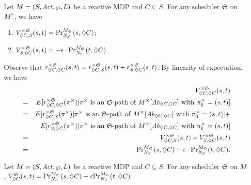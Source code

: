 \begin{proposition}
  Let $M = (S, \Act, \wp, L)$ be a reactive MDP and $C \subseteq S$.
  For any scheduler $\scheduler{S}$ on $M^{\times}$, we have
  \begin{enumerate}
  \item ${V}_{\gF C, S}^{\times\scheduler{S}} (s, t) =
    \myPr{s}{M_{\scheduler{S}}}{\neighbor{S}}{\gF C}$;
  \item ${V}_{S, \gF C}^{\times\scheduler{S}} (s, t) =
    -\epsilon \cdot \myPr{t}{M_{\scheduler{S}}}{\neighbor{S}}{\gF C}$.
  \end{enumerate}
  \label{proposition:individual-probability-nextC}
\end{proposition}

Observe that ${r}_{\gF C, \gF C}^{\times \scheduler{S}} (s, t) =
{r}_{\gF C, S}^{\times \scheduler{S}} (s, t) + {r}_{S, \gF C}^{\times
  \scheduler{S}} (s, t)$. By linearity of expectation, we have
\begin{eqnarray*}
  & & {V}_{\gF C, \gF C}^{\times \scheduler{S}} (s, t)\\
  &=& E[ {r}_{\gF C, \gF C}^{\times \scheduler{S}} (\pi^{\times}) |
      \pi^{\times} \textmd{ is an $\scheduler{S}$-path of }
      M^{\times}[\mathit{Ab}_{\gF C, \gF C}] \textmd{ with }
      \pi_0^{\times} = (s, t) ]\\
  &=&  E[ {r}_{\gF C, S}^{\times \scheduler{S}} (\pi^{\times}) |
      \pi^{\times} \textmd{ is an $\scheduler{S}$-path of }
      M^{\times}[\mathit{Ab}_{\gF C, \gF C}] \textmd{ with }
      \pi_0^{\times} = (s, t) ] +\\
  & &  E[ {r}_{S, \gF C}^{\times \scheduler{S}} (\pi^{\times}) |
      \pi^{\times} \textmd{ is an $\scheduler{S}$-path of }
      M^{\times}[\mathit{Ab}_{\gF C, \gF C}] \textmd{ with }
      \pi_0^{\times} = (s, t) ]\\
  &=& {V}_{\gF C, S}^{\times \scheduler{S}} (s, t) +
      {V}_{S, \gF C}^{\times \scheduler{S}} (s, t)\\
  &=& \myPr{s}{M_{\scheduler{S}}}{\neighbor{S}}{\gF C} -
      \epsilon \cdot \myPr{t}{M_{\scheduler{S}}}{\neighbor{S}}{\gF C}.
\end{eqnarray*}


\begin{lemma}
  Let $M = (S, \Act, \wp, L)$ be a reactive MDP and $C \subseteq S$.
  For any scheduler $\scheduler{S}$ on $M$,
  $V^{\scheduler{S}}_{\Diamond C} (s, t) =
  \myPr{s}{M_{\scheduler{S}}}{\neighbor{S}}{\gF C} -
  \epsilon \myPr{t}{M_{\scheduler{S}}}{\neighbor{S}}{\gF C}$.
\label{lemma:eventuallyC}
\end{lemma}

